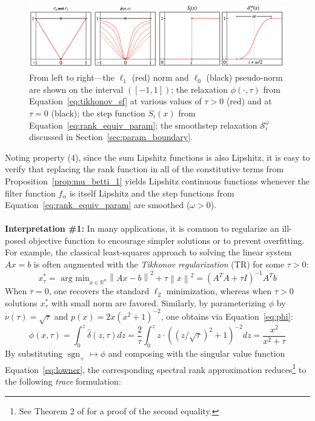 \documentclass[pdflatex,sn-mathphys-num]{sn-jnl}
\begin{document}
\begin{figure}\label{fig:smoothstep}
	\centering
	\includegraphics[width=1\linewidth,keepaspectratio]{../images/cont_relax.png}
	\caption{From left to right—the $\ell_1$ (red) norm and $\ell_0$ (black) pseudo-norm are shown on the interval $([- 1 , 1])$; the relaxation $\phi (\cdot, \tau)$ from Equation~\ref{eq:tikhonov_sf} at various values of $\tau > 0$ (red) and at $\tau = 0$ (black); the step function $S_i (x)$ from Equation~\ref{eq:rank_equiv_param}; the smoothstep relaxation $\mathcal{S}_i^\omega$ discussed in Section~\ref{sec:param_boundary}.}
\end{figure}
\noindent Noting property (4), since the sum Lipshitz functions is also Lipshitz, it is easy to verify that replacing the rank function in all of the constitutive terms from Proposition~\ref{prop:mu_betti_1} yields Lipshitz continuous functions whenever the filter function \(f_{\alpha}\) is itself Lipshitz and the step functions from Equation~\ref{eq:rank_equiv_param} are smoothed (\(\omega > 0\)).
\\
\\
\noindent \textbf{Interpretation \#1:} In many applications, it is common to regularize an ill-posed objective function to encourage simpler solutions or to prevent overfitting. For example, the classical least-squares approach to solving the linear system \(Ax = b\) is often augmented with the \emph{Tikhonov regularization} (TR) for some \(\tau > 0\):
\[\label{eq:tikhonov}
x_{\tau}^{\ast} = \text{ arg min}_{x \in \mathbb{R}^{n}}\left\| {Ax - b} \right\|^{2} + \tau\left\| x \right\|^{2} =  \left( A^{T}A + \tau I \right) ^{- 1}A^{T}b
\]
When \(\tau = 0\), one recovers the standard \(\ell_{2}\) minimization, whereas when \(\tau > 0\) solutions \(x_{\tau}^{\ast}\) with small norm are favored. Similarly, by parameterizing \(\phi\) by \(\nu(\tau) = \sqrt{\tau}\) and \(p(x) = 2x \left( x^{2} + 1 \right) ^{- 2}\), one obtains via Equation~\ref{eq:phi}:
\[\label{eq:tikhonov_sf}
\phi(x,\tau) = \int_{0}^{z}\hat{\delta}(z,\tau)dz = \frac{2}{\tau}\int_{0}^{z}z \cdot \left( \left( z/\sqrt{\tau} \right)^{2} + 1 \right)^{- 2}dz = \frac{x^{2}}{x^{2} + \tau}
\]
By substituting \(\operatorname{sgn}_{+} \mapsto \phi\) and composing with the singular value function Equation~\ref{eq:lowner}, the corresponding spectral rank approximation reduces\footnote{See Theorem 2 of \cite{zhao2012approximation} for a proof of the second equality.} to the following \emph{trace} formulation:
\end{document}
